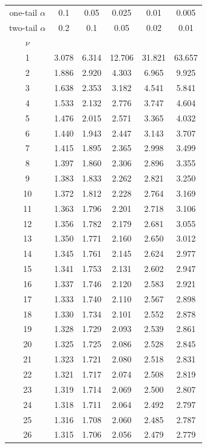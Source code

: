 \begin{center}
\small
\begin{tabular}{c|ccccc}
\toprule
one-tail $\alpha$ & 0.1 & 0.05 & 0.025 & 0.01 & 0.005 \\
two-tail $\alpha$ & 0.2 & 0.1 & 0.05 & 0.02 & 0.01 \\
$\nu$ &  &  &  &  &  \\
\midrule
1 & 3.078 & 6.314 & 12.706 & 31.821 & 63.657 \\
2 & 1.886 & 2.920 & 4.303 & 6.965 & 9.925 \\
3 & 1.638 & 2.353 & 3.182 & 4.541 & 5.841 \\
4 & 1.533 & 2.132 & 2.776 & 3.747 & 4.604 \\
5 & 1.476 & 2.015 & 2.571 & 3.365 & 4.032 \\
6 & 1.440 & 1.943 & 2.447 & 3.143 & 3.707 \\
7 & 1.415 & 1.895 & 2.365 & 2.998 & 3.499 \\
8 & 1.397 & 1.860 & 2.306 & 2.896 & 3.355 \\
9 & 1.383 & 1.833 & 2.262 & 2.821 & 3.250 \\
10 & 1.372 & 1.812 & 2.228 & 2.764 & 3.169 \\
11 & 1.363 & 1.796 & 2.201 & 2.718 & 3.106 \\
12 & 1.356 & 1.782 & 2.179 & 2.681 & 3.055 \\
13 & 1.350 & 1.771 & 2.160 & 2.650 & 3.012 \\
14 & 1.345 & 1.761 & 2.145 & 2.624 & 2.977 \\
15 & 1.341 & 1.753 & 2.131 & 2.602 & 2.947 \\
16 & 1.337 & 1.746 & 2.120 & 2.583 & 2.921 \\
17 & 1.333 & 1.740 & 2.110 & 2.567 & 2.898 \\
18 & 1.330 & 1.734 & 2.101 & 2.552 & 2.878 \\
19 & 1.328 & 1.729 & 2.093 & 2.539 & 2.861 \\
20 & 1.325 & 1.725 & 2.086 & 2.528 & 2.845 \\
21 & 1.323 & 1.721 & 2.080 & 2.518 & 2.831 \\
22 & 1.321 & 1.717 & 2.074 & 2.508 & 2.819 \\
23 & 1.319 & 1.714 & 2.069 & 2.500 & 2.807 \\
24 & 1.318 & 1.711 & 2.064 & 2.492 & 2.797 \\
25 & 1.316 & 1.708 & 2.060 & 2.485 & 2.787 \\
26 & 1.315 & 1.706 & 2.056 & 2.479 & 2.779 \\

\end{tabular}
\end{center}
